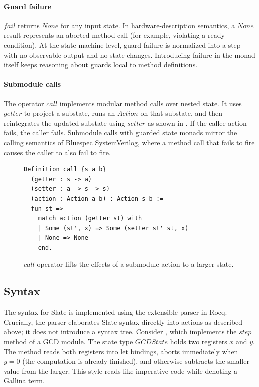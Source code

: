 \documentclass[fontset=fira-newtxsf]{mitthesis}
\theoremstyle{definition}
\theoremstyle{plain}
\begin{document}
\paragraph{Guard failure}
$\mathit{fail}$ returns $\mathit{None}$ for any input state.
In hardware-description semantics, a $\mathit{None}$ result represents an aborted method call (for example, violating a ready condition).
At the state-machine level, guard failure is normalized into a step with no observable output and no state changes.
Introducing failure in the monad itself keeps reasoning about guards local to method definitions.

\paragraph{Submodule calls}
The operator $\mathit{call}$ implements modular method calls over nested state.
It uses $\mathit{getter}$ to project a substate, runs an $\mathit{Action}$ on that substate, and then reintegrates the updated substate using $\mathit{setter}$ as shown in .
If the callee action fails, the caller fails.
Submodule calls with guarded state monads mirror the calling semantics of Bluespec SystemVerilog, where a method call that fails to fire causes the caller to also fail to fire.

\begin{figure}[H]
\begin{verbatim}
Definition call {s a b}
  (getter : s -> a)
  (setter : a -> s -> s)
  (action : Action a b) : Action s b :=
  fun st =>
    match action (getter st) with
    | Some (st', x) => Some (setter st' st, x)
    | None => None
    end.
\end{verbatim}
\caption[Call operator for actions]{$\mathit{call}$ operator lifts the effects of a submodule action to a larger state.}
\label{fig:action-call}
\end{figure}

\subsection{Syntax} \label{sec:timing-monads-slate}
The syntax for Slate is implemented using the extensible parser in Rocq.
Crucially, the parser elaborates Slate syntax directly into actions as described above; it does not introduce a syntax tree.
Consider , which implements the $\mathit{step}$ method of a GCD module.
The state type $\mathit{GCDState}$ holds two registers $\mathit{x}$ and $\mathit{y}$.
The method reads both registers into let bindings, aborts immediately when $\mathit{y} = 0$ (the computation is already finished), and otherwise subtracts the smaller value from the larger.
This style reads like imperative code while denoting a Gallina term.
\end{document}
